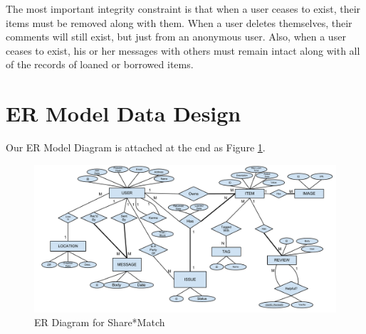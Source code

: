 \documentclass{acm_proc_article-sp}
\begin{document}
The most important integrity constraint is that when a user ceases to exist, their items must be removed along with them. When a user deletes themselves, their comments will still exist, but just from an anonymous user. Also, when a user ceases to exist, his or her messages with others must remain intact along with all of the records of loaned or borrowed items.

\section{ER Model Data Design}
Our ER Model Diagram is attached at the end as Figure \ref{fig:ERDiagram}.
\begin{figure}[p]
    \includegraphics[width=\textwidth]{EECS341ProjectERDiagram.pdf}
    \caption{ER Diagram for Share*Match}
    \label{fig:ERDiagram}
\end{figure}
\end{document}
